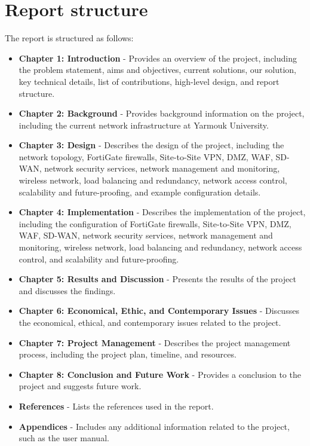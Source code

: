 \documentclass[12pt]{report}
\begin{document}

\section{Report structure}
The report is structured as follows:
\begin{itemize}
    \item \textbf{Chapter 1: Introduction} - Provides an overview of the project, including the problem statement, aims and objectives, current solutions, our solution, key technical details, list of contributions, high-level design, and report structure.
    \item \textbf{Chapter 2: Background} - Provides background information on the project, including the current network infrastructure at Yarmouk University.
    \item \textbf{Chapter 3: Design} - Describes the design of the project, including the network topology, FortiGate firewalls, Site-to-Site VPN, DMZ, WAF, SD-WAN, network security services, network management and monitoring, wireless network, load balancing and redundancy, network access control, scalability and future-proofing, and example configuration details.
    \item \textbf{Chapter 4: Implementation} - Describes the implementation of the project, including the configuration of FortiGate firewalls, Site-to-Site VPN, DMZ, WAF, SD-WAN, network security services, network management and monitoring, wireless network, load balancing and redundancy, network access control, and scalability and future-proofing.
    \item \textbf{Chapter 5: Results and Discussion} - Presents the results of the project and discusses the findings.
    \item \textbf{Chapter 6: Economical, Ethic, and Contemporary Issues} - Discusses the economical, ethical, and contemporary issues related to the project.

    \item \textbf{Chapter 7: Project Management} - Describes the project management process, including the project plan, timeline, and resources.
    \item \textbf{Chapter 8: Conclusion and Future Work} - Provides a conclusion to the project and suggests future work.
    \item \textbf{References} - Lists the references used in the report.
    \item \textbf{Appendices} - Includes any additional information related to the project, such as the user manual.
\end{itemize}
\end{document}
